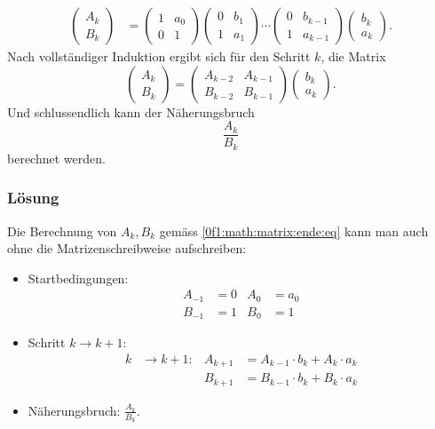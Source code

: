\begin{align*}
	\begin{pmatrix}
		A_k\\
		B_k
	\end{pmatrix}
	&=
	\begin{pmatrix}
		1& a_0\\
		0& 1
	\end{pmatrix}
	\begin{pmatrix}
		0& b_1\\
		1& a_1
	\end{pmatrix}
	\cdots
	\begin{pmatrix}
		0& b_{k-1}\\
		1& a_{k-1}
	\end{pmatrix}
	\begin{pmatrix}
		b_k\\
		a_k
	\end{pmatrix}.
\end{align*}
Nach vollständiger Induktion ergibt sich für den Schritt $k$, die Matrix
\begin{equation}
	\label{0f1:math:matrix:ende:eq}
	 \begin{pmatrix}
		A_{k}\\
		B_{k}			
	\end{pmatrix} 
	=
		\begin{pmatrix}
		A_{k-2}& A_{k-1}\\
		B_{k-2}& B_{k-1}			
	\end{pmatrix}
		\begin{pmatrix}
		b_k\\
		a_k
	\end{pmatrix}.
\end{equation}
Und schlussendlich kann der Näherungsbruch
\[
\frac{A_k}{B_k}
\] 
berechnet werden.


\subsubsection{Lösung}
Die Berechnung von $A_k, B_k$ gemäss \eqref{0f1:math:matrix:ende:eq} kann man auch ohne die Matrizenschreibweise \cite{0f1:kettenbrueche} aufschreiben:
\begin{itemize}
\item Startbedingungen:
\begin{align*}
A_{-1} &= 0		&		A_0 &= a_0 \\
B_{-1} &= 1		&		B_0 &= 1 
\end{align*}
\item Schritt $k\to k+1$:
\[
\begin{aligned}
\label{0f1:math:loesung:eq}
k &\rightarrow k + 1:
&
A_{k+1} &= A_{k-1} \cdot b_k + A_k \cdot a_k \\
&&
B_{k+1} &= B_{k-1} \cdot b_k + B_k \cdot a_k
\end{aligned}
\]
\item
Näherungsbruch: \qquad$\displaystyle\frac{A_k}{B_k}$.
\end{itemize}

